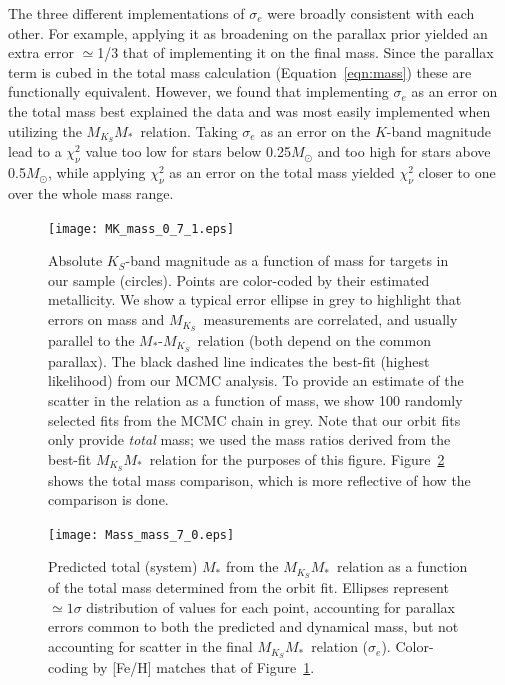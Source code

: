 \documentclass[twocolumn]{aastex62}
\newcommand{\mks}{$M_{K_S}$}
\newcommand{\mmk}{$M_{K_S}$\textendash$M_*$}
\begin{document}
The three different implementations of $\sigma_e$ were broadly consistent with each other. For example, applying it as broadening on the parallax prior yielded an extra error $\simeq$1/3 that of implementing it on the final mass. Since the parallax term is cubed in the total mass calculation (Equation~\ref{eqn:mass}) these are functionally equivalent. However, we found that implementing $\sigma_e$ as an error on the total mass best explained the data and was most easily implemented when utilizing the \mmk\ relation. Taking $\sigma_e$ as an error on the $K$-band magnitude lead to a $\chi^2_\nu$ value too low for stars below 0.25$M_\odot$ and too high for stars above 0.5$M_\odot$, while applying $\chi^2_\nu$ as an error on the total mass yielded $\chi^2_\nu$ closer to one over the whole mass range. 

\begin{figure}[htp]
\begin{center}
\texttt{[image: MK\_mass\_0\_7\_1.eps]}
\caption{Absolute $K_S$-band magnitude as a function of mass for targets in our sample (circles). Points are color-coded by their estimated metallicity. We show a typical error ellipse in grey to highlight that errors on mass and \mks\ measurements are correlated, and usually parallel to the $M_*$-\mks\ relation (both depend on the common parallax). The black dashed line indicates the best-fit (highest likelihood) from our MCMC analysis. To provide an estimate of the scatter in the relation as a function of mass, we show 100 randomly selected fits from the MCMC chain in grey. Note that our orbit fits only provide {\it total} mass; we used the mass ratios derived from the best-fit \mmk\ relation for the purposes of this figure. Figure~\ref{fig:m_m} shows the total mass comparison, which is more reflective of how the comparison is done. }
\label{fig:relation}
\end{center}
\end{figure}

\begin{figure}[ht]
\begin{center}
\texttt{[image: Mass\_mass\_7\_0.eps]}
\caption{Predicted total (system) $M_*$ from the \mmk\ relation as a function of the total mass determined from the orbit fit. Ellipses represent $\simeq1\sigma$ distribution of values for each point, accounting for parallax errors common to both the predicted and dynamical mass, but not accounting for scatter in the final \mmk\ relation ($\sigma_e$). Color-coding by [Fe/H] matches that of Figure~\ref{fig:relation}.}
\label{fig:m_m}
\end{center}
\end{figure}
\end{document}
